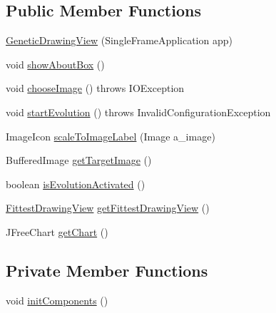 \subsection*{Public Member Functions}
\begin{DoxyCompactItemize}
\item 
\hyperlink{classexamples_1_1monalisa_1_1gui_1_1_genetic_drawing_view_a167a1c33d0e54e16453d49cfcc857bfd}{Genetic\-Drawing\-View} (Single\-Frame\-Application app)
\item 
void \hyperlink{classexamples_1_1monalisa_1_1gui_1_1_genetic_drawing_view_aad7b311c256aeca18b09e1cb7d1293a7}{show\-About\-Box} ()
\item 
void \hyperlink{classexamples_1_1monalisa_1_1gui_1_1_genetic_drawing_view_a0caf6cbdd971910244bf6c0da25ace1c}{choose\-Image} ()  throws I\-O\-Exception 
\item 
void \hyperlink{classexamples_1_1monalisa_1_1gui_1_1_genetic_drawing_view_aa9f0d9afbfe61ecea4808ca6a1d33cac}{start\-Evolution} ()  throws Invalid\-Configuration\-Exception 
\item 
Image\-Icon \hyperlink{classexamples_1_1monalisa_1_1gui_1_1_genetic_drawing_view_a2b9eb5082684acd0d59c8dd41c1add1d}{scale\-To\-Image\-Label} (Image a\-\_\-image)
\item 
Buffered\-Image \hyperlink{classexamples_1_1monalisa_1_1gui_1_1_genetic_drawing_view_ae4664910bd85dde57724c55d4ad96ec2}{get\-Target\-Image} ()
\item 
boolean \hyperlink{classexamples_1_1monalisa_1_1gui_1_1_genetic_drawing_view_aa17cff57c2d03c9eba588eb9df8fe0bb}{is\-Evolution\-Activated} ()
\item 
\hyperlink{classexamples_1_1monalisa_1_1gui_1_1_fittest_drawing_view}{Fittest\-Drawing\-View} \hyperlink{classexamples_1_1monalisa_1_1gui_1_1_genetic_drawing_view_acea852745353f59b253e2ee17dd224b3}{get\-Fittest\-Drawing\-View} ()
\item 
J\-Free\-Chart \hyperlink{classexamples_1_1monalisa_1_1gui_1_1_genetic_drawing_view_ae70c4029c9d7804bbd9aa4a7e42a3239}{get\-Chart} ()
\end{DoxyCompactItemize}
\subsection*{Private Member Functions}
\begin{DoxyCompactItemize}
\item 
void \hyperlink{classexamples_1_1monalisa_1_1gui_1_1_genetic_drawing_view_a50145559ca83b389a30dda3161c41336}{init\-Components} ()
\end{DoxyCompactItemize}
